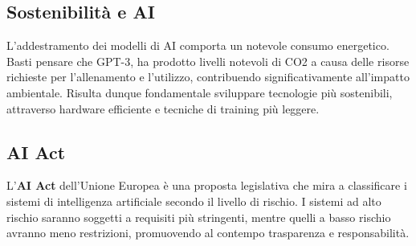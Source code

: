 \subsection{Sostenibilità e AI}

L’addestramento dei modelli di AI comporta un notevole consumo energetico. Basti pensare che GPT-3, ha prodotto livelli notevoli di CO2 a causa delle risorse richieste per l'allenamento e l'utilizzo, contribuendo significativamente all’impatto ambientale. Risulta dunque fondamentale sviluppare tecnologie più sostenibili, attraverso hardware efficiente e tecniche di training più leggere.

\subsection{AI Act}

L’\textbf{AI Act} dell’Unione Europea è una proposta legislativa che mira a classificare i sistemi di intelligenza artificiale secondo il livello di rischio. I sistemi ad alto rischio saranno soggetti a requisiti più stringenti, mentre quelli a basso rischio avranno meno restrizioni, promuovendo al contempo trasparenza e responsabilità.
